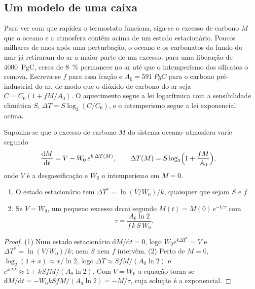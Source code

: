\subsection*{Um modelo de uma caixa}

Para ver com que rapidez o termostato funciona, siga-se o excesso de carbono $M$ que o oceano e a atmosfera
contêm acima de um estado estacionário. Poucos milhares de anos após uma perturbação, o oceano e os carbonatos
do fundo do mar já retiraram do ar a maior parte de um excesso; para uma liberação de \qty{4000}{PgC}, cerca de
\qty{8}{\percent} permanece no ar até que o intemperismo dos silicatos o remova. Escreva-se $f$ para essa
fração e $A_0 = \qty{591}{PgC}$ para o carbono pré-industrial do ar, de modo que o dióxido de carbono
do ar seja $C = C_0(1 + fM/A_0)$. O aquecimento segue a lei logarítmica com a sensibilidade
climática $S$, $\Delta T = S\log_2(C/C_0)$, e o intemperismo segue a lei exponencial acima.

\begin{proposition}\label{prop:b2:deep-time-climate:thermostat}
Suponha-se que o excesso de carbono $M$ do sistema oceano--atmosfera varie segundo
\[
  \frac{\mathrm dM}{\mathrm dt} = V - W_0\,e^{k\,\Delta T(M)}, \qquad
  \Delta T(M) = S\log_2\Bigl(1 + \frac{fM}{A_0}\Bigr),
\]
onde $V$ é a desgaseificação e $W_0$ o intemperismo em $M = 0$.
\begin{enumerate}
  \item O estado estacionário tem $\Delta T^* = \ln(V/W_0)/k$, quaisquer que sejam $S$ e $f$.
  \item Se $V = W_0$, um pequeno excesso decai segundo $M(t) = M(0)\,e^{-t/\tau}$ com
        \[
          \tau = \frac{A_0 \ln 2}{f\,k\,S\,W_0} .
        \]
\end{enumerate}
\end{proposition}

\begin{proof}
(1) Num estado estacionário $\mathrm dM/\mathrm dt = 0$, logo $W_0e^{k\Delta T^*} = V$ e $\Delta T^* =
\ln(V/W_0)/k$; nem $S$ nem $f$ intervêm. (2) Perto de $M = 0$, $\log_2(1 + x) \approx x/\ln 2$, logo
$\Delta T \approx SfM/(A_0\ln 2)$ e $e^{k\Delta T} \approx 1 + kSfM/(A_0\ln2)$. Com $V = W_0$ a
equação torna-se $\mathrm dM/\mathrm dt = -W_0kSfM/(A_0\ln 2) = -M/\tau$, cuja solução é a
exponencial.
\end{proof}

